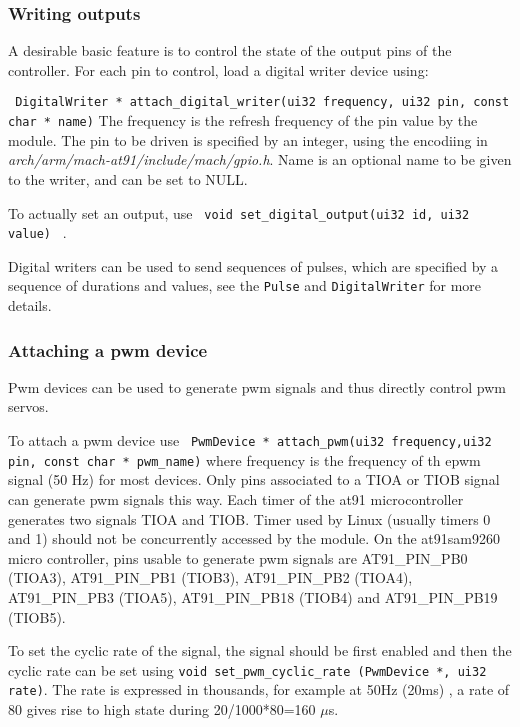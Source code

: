 \documentclass[a4paper]{article}
\newcommand{\instruction}[1]{{\tt #1}}
\newcommand{\file}[1]{\emph{#1}}
\begin{document}
\subsubsection{Writing outputs}

A desirable basic feature is to control the state of the output pins of the
controller. For each pin to control, load a digital writer device using:

\instruction{
DigitalWriter * attach\_digital\_writer(ui32 frequency, ui32 pin, const char *
name)}
The frequency is the refresh frequency of the pin value by the module.
The pin to be driven is specified by an integer, using the encodiing in
\file{arch/arm/mach-at91/include/mach/gpio.h}. Name is an optional name to be
given to the writer, and can be set to NULL.


To actually set an output, use
\instruction{
void set\_digital\_output(ui32 id, ui32 value)
}
.

Digital writers can be used to send sequences of pulses,
which are specified by a sequence of durations and values,
see the \instruction{Pulse} and \instruction{DigitalWriter} for more details.



\subsubsection{Attaching a pwm device}

Pwm devices can be used to generate pwm signals and thus directly control
pwm servos.

To attach a pwm device use
\instruction{
PwmDevice * attach\_pwm(ui32 frequency,ui32 pin,  const char *
pwm\_name)}
where frequency is the frequency of th epwm signal (50 Hz) for most devices.
Only pins associated to a TIOA or TIOB signal can generate pwm signals this
way. Each timer of the at91 microcontroller generates two signals TIOA and
TIOB. Timer used by Linux (usually timers 0 and 1) should not be
concurrently accessed by the module.
On the at91sam9260 micro controller, pins usable to generate pwm signals are
AT91\_PIN\_PB0 (TIOA3), AT91\_PIN\_PB1 (TIOB3),  AT91\_PIN\_PB2 (TIOA4), AT91\_PIN\_PB3
(TIOA5),  AT91\_PIN\_PB18 (TIOB4) and AT91\_PIN\_PB19 (TIOB5).
 
To set the cyclic rate of the signal, the signal should be first enabled
and then the cyclic rate can be set using \instruction{void
set\_pwm\_cyclic\_rate (PwmDevice *, ui32 rate)}. The rate is expressed in
thousands, for example at 50Hz (20ms) , a rate of 80 gives rise to high state during 20/1000*80=160
$\mu$s.
\end{document}
